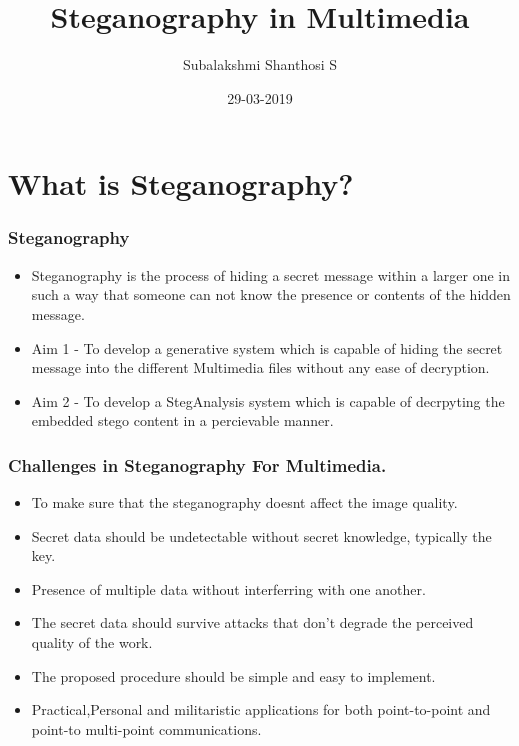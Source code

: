 \documentclass{beamer} %
\title{Steganography in Multimedia}
\author{Subalakshmi Shanthosi S}
\institute{SSN College of Engineering}
\date{}
\date[short date]{29-03-2019}
\theoremstyle{definition} %
\begin{document}
\begin{frame} 
\titlepage
\end{frame}

\section{What is Steganography?} %

\begin{frame} 
\frametitle{Steganography}
 \begin{itemize}
 \item{Steganography is the process of hiding a secret message within a
 larger one in such a way that someone can not know the presence or contents of the hidden message. }
\end{itemize}
\begin{itemize}
 \item{Aim 1 - To develop a generative system which is capable of hiding the secret message into the different Multimedia files without any ease of decryption.}
 \item{Aim 2 - To develop a StegAnalysis system which is capable of decrpyting the embedded stego content in a percievable manner.}
\end{itemize}

\end{frame}

\begin{frame}
\frametitle{Challenges in Steganography For Multimedia.}
 \begin{itemize}
	\item{To make sure that the steganography doesnt affect the image quality.}
\end{itemize}
\begin{itemize}
	\item{Secret data should be undetectable without secret
		knowledge, typically the key.}
\end{itemize}
\begin{itemize}
	\item {Presence of multiple data without interferring with one another.}
\end{itemize}
\begin{itemize}
	\item{The secret data should survive attacks that don’t
		degrade the perceived quality of the work.}
\end{itemize}
\begin{itemize}
   \item{The proposed procedure should be simple and easy to implement.}
\end{itemize}
\begin{itemize}
   	\item Practical,Personal and militaristic applications for both point-to-point and point-to multi-point communications. 
\end{itemize}
\end{frame}
\end{document}
